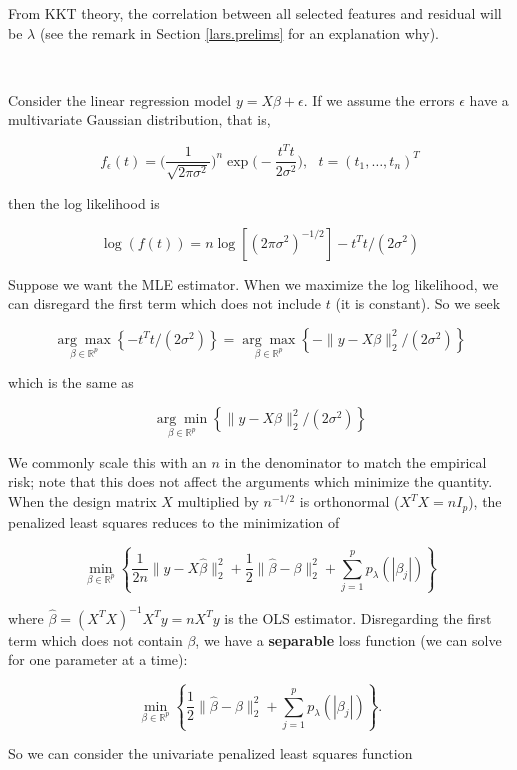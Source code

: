 From KKT theory, the correlation between all selected features and residual will be \(\lambda\) (see the remark in Section \ref{lars.prelims} for an explanation why).

\

Consider the linear regression model \(y = X \beta + \epsilon\). If we assume the errors \(\epsilon\) have a multivariate Gaussian distribution, that is,

\[
f_\epsilon(t) = \bigg( \frac{1}{ \sqrt{2\pi \sigma^2}}   \bigg)^n \exp \bigg( - \frac{t^T t}{2 \sigma^2} \bigg) , \ \ \ t = (t_1, \ldots, t_n)^T
\]

then the log likelihood is

\[
\log(f(t)) = n \log[(2 \pi \sigma^2)^{-1/2}] - t^Tt/(2 \sigma^2)
\]

Suppose we want the MLE estimator. When we maximize the log likelihood, we can disregard the first term which does not include \(t\) (it is constant). So we seek

\[
\underset{\beta \in \mathbb{R}^p}{\arg \max} \left\{ -t^Tt/(2 \sigma^2) \right\} = \underset{\beta \in \mathbb{R}^p}{\arg \max}  \left\{- \lVert y - X \beta \rVert_2^2 /(2 \sigma^2) \right\}
\]

which is the same as

\[
\underset{\beta \in \mathbb{R}^p}{\arg \min} \left\{ \lVert y - X \beta \rVert_2^2 /(2 \sigma^2) \right\}
\]

We commonly scale this with an \(n\) in the denominator to match the empirical risk; note that this does not affect the arguments which minimize the quantity. When the design matrix \(X\) multiplied by \(n^{-1/2}\) is orthonormal (\(X^TX = nI_p\)), the penalized least squares reduces to the minimization of 

\[
\min_{\beta \in \mathbb{R}^p} \left\{ \frac{1}{2n} \lVert y - X \hat{\beta} \rVert_2^2 + \frac{1}{2} \lVert \hat{\beta} - \beta \rVert_2^2 + \sum_{j=1}^p p_\lambda ( | \beta_j|)    \right\}
\]

where \(\hat{\beta} = (X^TX)^{-1}X^Ty = nX^T y\) is the OLS estimator. Disregarding the first term which does not contain \(\beta\), we have a \textbf{separable} loss function (we can solve for one parameter at a time):

\[
\min_{\beta \in \mathbb{R}^p} \left\{  \frac{1}{2} \lVert \hat{\beta} - \beta \rVert_2^2 + \sum_{j=1}^p p_\lambda ( | \beta_j|)   \right\}.
\]

So we can consider the univariate penalized least squares function

